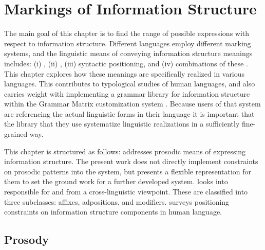 \chapter{Markings of Information Structure}
\label{chapter4}
\setcounter{enums}{0}


\noindent The main goal of this chapter is to find the range of
possible expressions with respect to information structure. Different
languages employ different marking systems, and the linguistic means
of conveying information structure meanings includes: (i)
, (ii) , (iii) syntactic
positioning, and (iv) combinations of these \citep{gundel:99}. This
chapter explores how these meanings are specifically realized in
various languages.  This contributes to typological studies of human
languages, and also carries weight with implementing a grammar library
for information structure within the \lingo Grammar Matrix
customization system
\citep{bender:flickinger:05,drellishak:09,bender:etal:10}.  Because
users of that system are referencing the actual linguistic forms in
their language it is important that the library that they use
systematize linguistic realizations in a sufficiently fine-grained
way.


This chapter is structured as follows:  addresses
prosodic means of expressing information structure. The
present work does not directly implement constraints on prosodic
patterns into the system, but presents a flexible representation for
them to set the ground work for a further developed system.
 looks into  responsible for
 and  from a cross-linguistic viewpoint. These are
classified into three subclasses: affixes, adpositions, and
modifiers.  surveys positioning
constraints on information structure components in human language.





\section{Prosody}
\label{4:sec:prosody}

